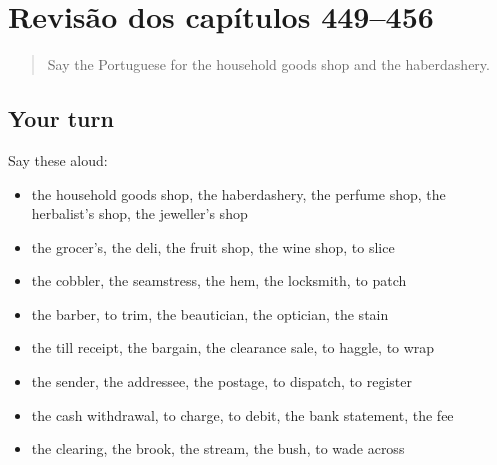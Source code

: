 \section[(dialogue)]{Revisão dos capítulos 449–456}

\label{lesson:PT-R456-revisao-449-456}



\begin{quote}
Say the Portuguese for the household goods shop and the haberdashery.
\end{quote}

\subsection*{Your turn}
Say these aloud:

\begin{itemize}
\raggedright
  \item the household goods shop, the haberdashery, the perfume shop, the herbalist's shop, the jeweller's shop
  \item the grocer's, the deli, the fruit shop, the wine shop, to slice
  \item the cobbler, the seamstress, the hem, the locksmith, to patch
  \item the barber, to trim, the beautician, the optician, the stain
  \item the till receipt, the bargain, the clearance sale, to haggle, to wrap
  \item the sender, the addressee, the postage, to dispatch, to register
  \item the cash withdrawal, to charge, to debit, the bank statement, the fee
  \item the clearing, the brook, the stream, the bush, to wade across
\end{itemize}

